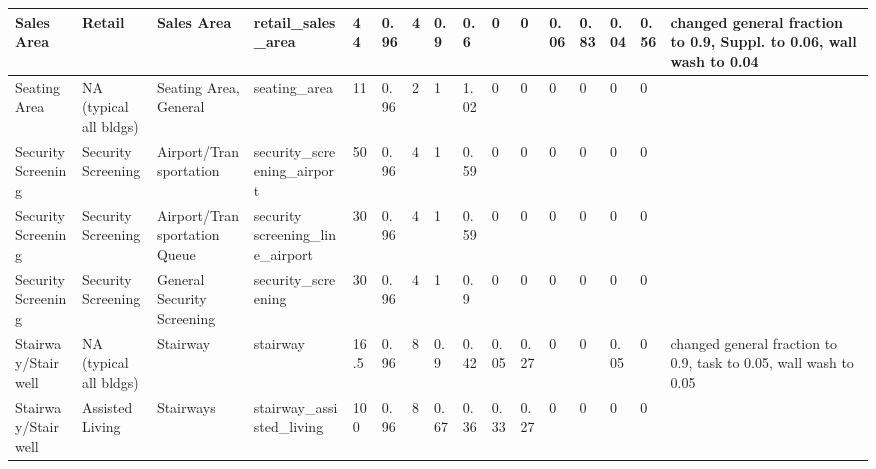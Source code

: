 \begin{center}
\begin{landscape}
\begin{longtable}{|p{0.75in}|p{0.75in}|p{0.75in}|p{0.75in}|p{0.3in}|p{0.3in}|p{0.3in}|p{0.3in}|p{0.3in}|p{0.3in}|p{0.3in}|p{0.3in}|p{0.3in}|p{0.3in}|p{0.3in}|p{0.6in}|}
      Sales Area                              & Retail                      & Sales Area                                      & retail\_sales\_area                                             & 44   & 0.96 & 4  & 0.9    & 0.6   & 0     & 0     & 0.06 & 0.83 & 0.04 & 0.56 & changed general fraction to 0.9, Suppl. to 0.06, wall wash to 0.04              \\ \hline
      Seating Area                            & NA (typical all bldgs)      & Seating Area, General                           & seating\_area                                                   & 11   & 0.96 & 2  & 1      & 1.02  & 0     & 0     & 0    & 0    & 0    & 0    &                                                                                       \\ \hline
      Security Screening                      & Security Screening          & Airport/Transportation                        & security\_screening\_airport                                    & 50   & 0.96 & 4  & 1      & 0.59  & 0     & 0     & 0    & 0    & 0    & 0    &                                                                                       \\ \hline
      Security Screening                      & Security Screening          & Airport/Transportation Queue                  & security screening\_line\_airport                               & 30   & 0.96 & 4  & 1      & 0.59  & 0     & 0     & 0    & 0    & 0    & 0    &                                                                                       \\ \hline
      Security Screening                      & Security Screening          & General Security Screening                      & security\_screening                                             & 30   & 0.96 & 4  & 1      & 0.9   & 0     & 0     & 0    & 0    & 0    & 0    &                                                                                       \\ \hline
      Stairway/Stairwell                    & NA (typical all bldgs)      & Stairway                                        & stairway                                                        & 16.5 & 0.96 & 8  & 0.9    & 0.42  & 0.05  & 0.27  & 0    & 0    & 0.05 & 0    & changed general fraction to 0.9, task to 0.05, wall wash to 0.05                      \\ \hline
      Stairway/Stairwell                    & Assisted Living             & Stairways                                       & stairway\_assisted\_living                                      & 100  & 0.96 & 8  & 0.67   & 0.36  & 0.33  & 0.27  & 0    & 0    & 0    & 0    &                                                                                       \\ \hline

\end{longtable}
\end{landscape}
\end{center}

